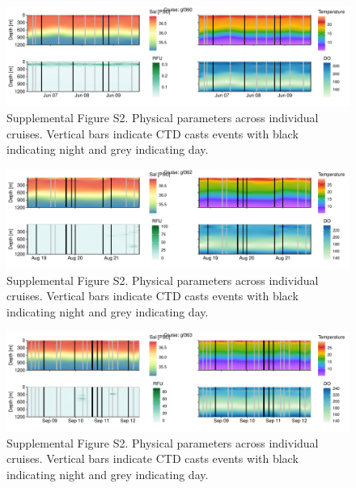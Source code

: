 \documentclass[
]{article}
\begin{document}
\begin{figure}

{\centering \includegraphics[width=1\textwidth,height=\textheight]{index_files/figure-pdf/unnamed-chunk-19-2.pdf}

}

\caption{Supplemental Figure S2. Physical parameters across individual
cruises. Vertical bars indicate CTD casts events with black indicating
night and grey indicating day.}

\end{figure}

\begin{figure}

{\centering \includegraphics[width=1\textwidth,height=\textheight]{index_files/figure-pdf/unnamed-chunk-19-3.pdf}

}

\caption{Supplemental Figure S2. Physical parameters across individual
cruises. Vertical bars indicate CTD casts events with black indicating
night and grey indicating day.}

\end{figure}

\begin{figure}

{\centering \includegraphics[width=1\textwidth,height=\textheight]{index_files/figure-pdf/unnamed-chunk-19-4.pdf}

}

\caption{Supplemental Figure S2. Physical parameters across individual
cruises. Vertical bars indicate CTD casts events with black indicating
night and grey indicating day.}

\end{figure}
\end{document}
